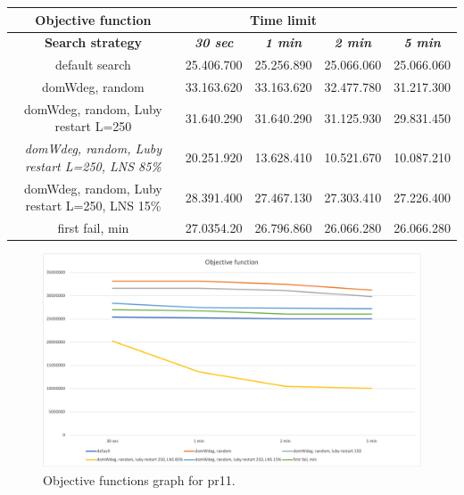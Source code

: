 {
\renewcommand{\arraystretch}{2}
\begin{longtable}[h]{| c | c | c | c | c |}
    \hline
    \textbf{Objective function} & \multicolumn{3}{c}{Time limit} & \\
    \hline
    \textbf{Search strategy} & \textbf{\textit{30 sec}} & \textbf{\textit{1 min}} & \textbf{\textit{2 min}} & \textbf{\textit{5 min}} \\
    \hline
    \endhead
    default search                                         & 25.406.700 & 25.256.890 & 25.066.060 & 25.066.060 \\
    \hline
    domWdeg, random                                        & 33.163.620 & 33.163.620 & 32.477.780 & 31.217.300 \\
    \hline
    domWdeg, random, Luby restart L=250                    & 31.640.290 & 31.640.290 & 31.125.930 & 29.831.450 \\
    \hline
    \textit{domWdeg, random, Luby restart L=250, LNS 85\%} & 20.251.920 & 13.628.410 & 10.521.670 & 10.087.210 \\
    \hline
    domWdeg, random, Luby restart L=250, LNS 15\%          & 28.391.400 & 27.467.130 & 27.303.410 & 27.226.400 \\
    \hline
    first fail, min                                        & 27.0354.20 & 26.796.860 & 26.066.280 & 26.066.280 \\
    \hline
\end{longtable}
}
\begin{figure}[H]
    \centering
    \includegraphics[width=1.0\columnwidth]{../graphs/pr11-objf.png}
    \caption{Objective functions graph for pr11.}
\end{figure}

